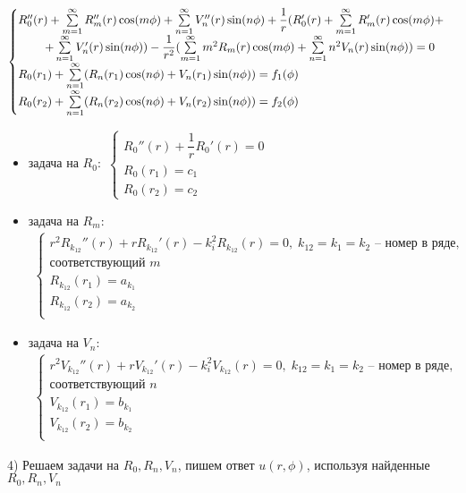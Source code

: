 \begin{solution}
	$$\begin{cases}
		R_0''(r) + \sum\limits_{m = 1}^\infty R_m''(r)\cos(m \phi) + \sum\limits_{n = 1}^\infty V_n''(r)\sin(n \phi) + \dfrac{1}{r}(R_0'(r) + \sum\limits_{m = 1}^\infty R_m'(r)\cos(m \phi) + \\
		\hspace{0.8cm}+ \sum\limits_{n = 1}^\infty V_n'(r)\sin(n \phi)) - \dfrac{1}{r^2}(\sum\limits_{m = 1}^\infty m^2 R_m(r)\cos(m \phi) + \sum\limits_{n = 1}^\infty n^2 V_n(r) \sin(n \phi)) = 0 \\
		R_0(r_1) + \sum \limits_{n = 1}^{\infty} (R_n(r_1) \cos(n \phi) + V_n (r_1) \sin(n \phi)) = f_1 (\phi) \\
		R_0(r_2) + \sum \limits_{n = 1}^{\infty} (R_n(r_2) \cos(n \phi) + V_n (r_2) \sin(n \phi)) = f_2 (\phi) \\
	\end{cases}$$
	\begin{itemize}
		\item 
			задача на $R_0:$ 
			$\begin{cases}
				R_0''(r) + \dfrac{1}{r} R_0'(r) = 0 \\
				R_0(r_1) = c_1 \\
				R_0(r_2) = c_2
			\end{cases}$
		\item 
			задача на $R_m:$
			$$\begin{gathered}
				\begin{cases}
				r^2 R_{k_{12}}''(r) + r R_{k_{12}}'(r) - k_i^2 R_{k_{12}}(r) = 0, \; k_{12} = k_1 = k_2  \text{ -- номер в ряде,} \\ \text{соответствующий }m \\
				R_{k_{12}}(r_1) = a_{k_1} \\
				R_{k_{12}}(r_2) = a_{k_2} \\
				\end{cases}
			\end{gathered}$$
		\item 
			задача на $ V_n: $
			$$\begin{gathered}
				\begin{cases}
				r^2 V_{k_{12}}''(r) + r V_{k_{12}}'(r) - k_i^2 V_{k_{12}}(r) = 0, \; k_{12} = k_1 = k_2 \text{ -- номер в ряде,} \\ \text{соответствующий } n\\
				V_{k_{12}}(r_1) = b_{k_1} \\
				V_{k_{12}}(r_2) = b_{k_2} \\
				\end{cases}
			\end{gathered}$$
	\end{itemize}

	4) Решаем задачи на $R_0, R_n, V_n$, пишем ответ $u(r, \phi)$, используя найденные $R_0, R_n, V_n$

\end{solution}

